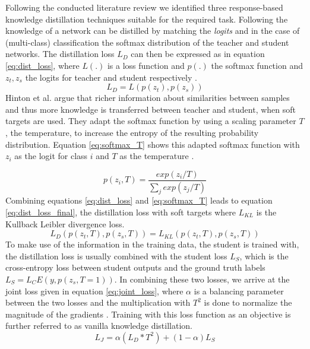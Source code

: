 \documentclass{article}
\begin{document}
Following the conducted literature review we identified three response-based knowledge distillation techniques suitable for the required task.
Following \cite{hintonDistillingKnowledgeNeural2015} the knowledge of a network can be distilled by matching the \textit{logits} and in the case of (multi-class) classification the softmax distribution of the teacher and student networks. The distillation loss $ L_D $ can then be expressed as in equation \ref{eq:dist_loss}, where $ L(.) $ is a loss function and $ p(.) $ the softmax function and $ z_t, z_s $ the logits for teacher and student respectively \cite{gouKnowledgeDistillationSurvey2021}.
\begin{equation}
\label{eq:dist_loss}
L_D = L(p(z_t), p(z_s))
\end{equation}
Hinton et al. argue that richer information about similarities between samples and thus more knowledge is transferred between teacher and student, when soft targets are used. They adapt the softmax function by using a scaling parameter $ T $, the temperature, to increase the entropy of the resulting probability distribution. Equation \ref{eq:softmax_T} shows this adapted softmax function with $ z_i $ as the logit for class $ i $ and $ T $ as the temperature \cite{hintonDistillingKnowledgeNeural2015}.

\begin{equation}
\label{eq:softmax_T}
p(z_i, T) = \frac{exp(z_i / T)}{\sum_{j}exp(z_j/ T)}
\end{equation}
Combining equations \ref{eq:dist_loss} and \ref{eq:softmax_T} leads to equation \ref{eq:dist_loss_final}, the distillation loss with soft targets where $ L_{KL} $ is the Kullback Leibler divergence loss.
\begin{equation}
\label{eq:dist_loss_final}
L_D(p(z_t, T), p(z_s, T)) = L_{KL}(p(z_t, T), p(z_s, T))
\end{equation}
To make use of the information in the training data, the student is trained with, the distillation loss is usually combined with the student loss $ L_S $, which is the cross-entropy loss between student outputs and the ground truth labels $ L_S = L_CE(y, p(z_s, T=1)) $. In combining these two losses, we arrive at the joint loss given in equation \ref{eq:joint_loss}, where $ \alpha $ is a balancing parameter between the two losses and the multiplication with $ T^2 $ is done to normalize the magnitude of the gradients \cite{hintonDistillingKnowledgeNeural2015}. Training with this loss function as an objective is further referred to as vanilla knowledge distillation.
\begin{equation}
\label{eq:joint_loss}
L_J = \alpha  (L_D * T^2) + (1 - \alpha) L_S
\end{equation}
\end{document}
